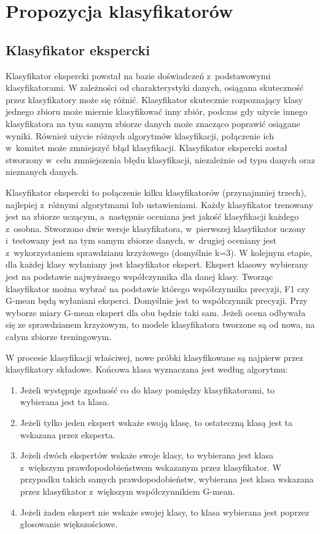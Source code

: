 \chapter{Propozycja klasyfikatorów}
\section{Klasyfikator ekspercki}
Klasyfikator ekspercki powstał na bazie doświadczeń z~podstawowymi klasyfikatorami. W zależności od charakterystyki danych, osiągana skuteczność przez klasyfikatory może się różnić. Klasyfikator skutecznie rozpoznający klasy jednego zbioru może miernie klasyfikować inny zbiór, podczas gdy użycie innego klasyfikatora na tym samym zbiorze danych może znacząco poprawić osiągane wyniki. Również użycie różnych algorytmów klasyfikacji, połączenie ich w~komitet może zmniejszyć błąd klasyfikacji. 
Klasyfikator ekspercki został stworzony w~celu zmniejszenia błędu klasyfikacji, niezależnie od typu danych oraz nieznanych danych. \par
Klasyfikator ekspercki to połączenie kilku klasyfikatorów (przynajmniej trzech), najlepiej z~różnymi algorytmami lub ustawieniami. Każdy klasyfikator trenowany jest na zbiorze uczącym, a~następnie oceniana jest jakość klasyfikacji każdego z~osobna. Stworzono dwie wersje klasyfikatora, w~pierwszej klasyfikator uczony i~testowany jest na tym samym zbiorze danych, w~drugiej oceniany jest z~wykorzystaniem sprawdzianu krzyżowego (domyślnie k=3). W kolejnym etapie, dla każdej klasy wyłaniany jest klasyfikator ekspert. Ekspert klasowy wybierany jest na podstawie najwyższego współczynnika dla danej klasy. Tworząc klasyfikator można wybrać na podstawie którego współczynnika precyzji, F1 czy G-mean będą wyłaniani eksperci. Domyślnie jest to współczynnik precyzji. Przy wyborze miary G-mean ekspert dla obu będzie taki sam. Jeżeli ocena odbywała się ze sprawdzianem krzyżowym, to modele klasyfikatora tworzone są od nowa, na całym zbiorze treningowym. \par
W procesie klasyfikacji właściwej, nowe próbki klasyfikowane są najpierw przez klasyfikatory składowe. Końcowa klasa wyznaczana jest według algorytmu:
\begin{enumerate}
	\item Jeżeli występuje zgodność co do klasy pomiędzy klasyfikatorami, to wybierana jest ta klasa.
	\item Jeżeli tylko jeden ekspert wskaże swoją klasę, to ostateczną klasą jest ta wskazana przez eksperta.
	\item Jeżeli dwóch ekspertów wskaże swoje klasy, to wybierana jest klasa z~większym prawdopodobieństwem wskazanym przez klasyfikator. W przypadku takich samych prawdopodobieństw, wybierana jest klasa wskazana przez klasyfikator z~większym współczynnikiem G-mean.
	\item Jeżeli żaden ekspert nie wskaże swojej klasy, to klasa wybierana jest poprzez głosowanie większościowe.
\end{enumerate}
